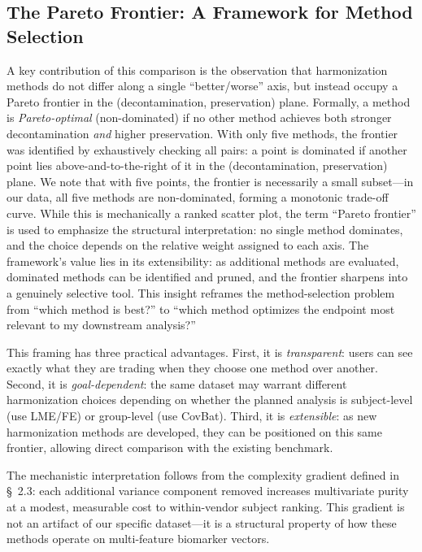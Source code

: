 \documentclass[12pt,a4paper]{article}
\begin{document}
\subsection{The Pareto Frontier: A Framework for Method Selection}

A key contribution of this comparison is the observation that harmonization methods do not differ along a single ``better/worse'' axis, but instead occupy a Pareto frontier in the (decontamination, preservation) plane. Formally, a method is \emph{Pareto-optimal} (non-dominated) if no other method achieves both stronger decontamination \emph{and} higher preservation. With only five methods, the frontier was identified by exhaustively checking all pairs: a point is dominated if another point lies above-and-to-the-right of it in the (decontamination, preservation) plane. We note that with five points, the frontier is necessarily a small subset---in our data, all five methods are non-dominated, forming a monotonic trade-off curve. While this is mechanically a ranked scatter plot, the term ``Pareto frontier'' is used to emphasize the structural interpretation: no single method dominates, and the choice depends on the relative weight assigned to each axis. The framework's value lies in its extensibility: as additional methods are evaluated, dominated methods can be identified and pruned, and the frontier sharpens into a genuinely selective tool. This insight reframes the method-selection problem from ``which method is best?'' to ``which method optimizes the endpoint most relevant to my downstream analysis?''

This framing has three practical advantages. First, it is \emph{transparent}: users can see exactly what they are trading when they choose one method over another. Second, it is \emph{goal-dependent}: the same dataset may warrant different harmonization choices depending on whether the planned analysis is subject-level (use LME/FE) or group-level (use CovBat). Third, it is \emph{extensible}: as new harmonization methods are developed, they can be positioned on this same frontier, allowing direct comparison with the existing benchmark.

The mechanistic interpretation follows from the complexity gradient defined in \S~2.3: each additional variance component removed increases multivariate purity at a modest, measurable cost to within-vendor subject ranking. This gradient is not an artifact of our specific dataset---it is a structural property of how these methods operate on multi-feature biomarker vectors.
\end{document}
